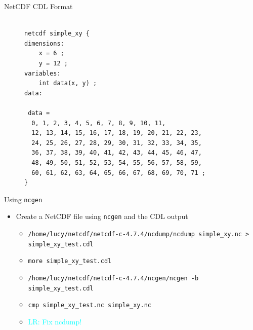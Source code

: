\documentclass[compress,11pt,xcolor=svgnames,aspectratio=169]{beamer}
\newcommand{\lr}[1]{\textcolor{cyan}{LR: #1}}
\begin{document}
\begin{frame}[fragile]{NetCDF CDL Format}

\begin{figure}
\centering
\begin{varwidth}{\linewidth}
{\footnotesize

\begin{verbatim}

netcdf simple_xy {
dimensions:
	x = 6 ;
	y = 12 ;
variables:
	int data(x, y) ;
data:

 data =
  0, 1, 2, 3, 4, 5, 6, 7, 8, 9, 10, 11,
  12, 13, 14, 15, 16, 17, 18, 19, 20, 21, 22, 23,
  24, 25, 26, 27, 28, 29, 30, 31, 32, 33, 34, 35,
  36, 37, 38, 39, 40, 41, 42, 43, 44, 45, 46, 47,
  48, 49, 50, 51, 52, 53, 54, 55, 56, 57, 58, 59,
  60, 61, 62, 63, 64, 65, 66, 67, 68, 69, 70, 71 ;
}

\end{verbatim}

}
\end{varwidth}
\end{figure}

\end{frame}

\begin{frame}[fragile]{Using \texttt{ncgen}}

\begin{itemize}

  \item Create a NetCDF file using \verb|ncgen| and the CDL output\\[0.4cm]

    \begin{itemize}
    \setlength\itemsep{0.5cm}

      \item \verb|/home/lucy/netcdf/netcdf-c-4.7.4/ncdump/ncdump simple_xy.nc > simple_xy_test.cdl|
      \item \verb|more simple_xy_test.cdl|
      \item \verb|/home/lucy/netcdf/netcdf-c-4.7.4/ncgen/ncgen -b simple_xy_test.cdl|
      \item \verb|cmp simple_xy_test.nc simple_xy.nc|
      \item \lr{Fix ncdump!}

    \end{itemize}

\end{itemize}

\end{frame}
\end{document}
